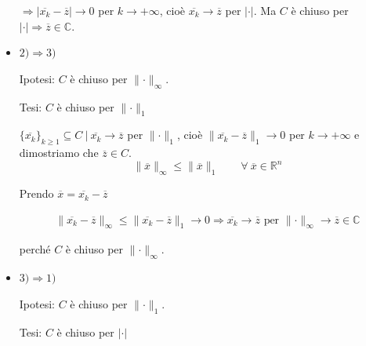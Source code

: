 \begin{exbar}
\begin{example}
\begin{itemize}
		$\Rightarrow |\overline{x_k} - \overline{z}| \rightarrow 0$ per $k \rightarrow +\infty$, cioè $\overline{x_k} \rightarrow \overline{z}$ per $|\cdot|$. Ma $C$ è chiuso per $|\cdot| \Rightarrow \overline{z} \in \mathbb{C}$.
		
		\item $2) \Rightarrow 3)$
		
		Ipotesi: $C$ è chiuso per $\parallel \cdot \parallel_\infty$.
		
		Tesi: $C$ è chiuso per $\parallel \cdot \parallel_1$
		
		$\{ \overline{x_k} \}_{k \geq 1} \subseteq C \ \big| \ \overline{x_k} \rightarrow \overline{z}$ per $\parallel \cdot \parallel_1$, cioè $\parallel \overline{x_k} - \overline{z} \parallel_1 \rightarrow 0$ per $k \rightarrow +\infty$ e dimostriamo che $\overline{z} \in C$.
		\begin{equation*}
			\parallel \overline{x} \parallel_\infty \leq \parallel \overline{x} \parallel_1 \qquad \forall \ \overline{x}\in \mathbb{R}^n
		\end{equation*}

		Prendo $\overline{x} = \overline{x_k} -\overline{z}$
		
		\begin{gather*}
			\parallel \overline{x_k} - \overline{z} \parallel_\infty \leq  \parallel \overline{x_k} -\overline{z} \parallel_1 \rightarrow 0 \Rightarrow \overline{x_k}  \rightarrow \overline{z} \text{ per } \parallel \cdot \parallel_\infty \rightarrow \overline{z} \in \mathbb{C}
		\end{gather*}
	
		perché $C $ è chiuso  per $\parallel \cdot \parallel_\infty$.
		
		\item $3) \Rightarrow 1)$ 
		
		Ipotesi: $C$ è chiuso per $\parallel \cdot \parallel_1$. 
		
		Tesi: $C$ è chiuso per $|\cdot|$
		

\end{itemize}
\end{example}
\end{exbar}
